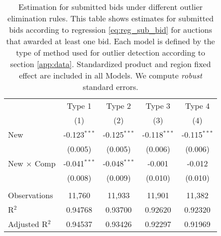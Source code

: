
\begin{table}[H]
   \centering
   \begin{tabular}{lcccc}
      \toprule
       & Type 1         & Type 2         & Type 3         & Type 4 \\ & (1)            & (2)            & (3)            & (4)\\  
      \midrule 
      New                       & -0.123$^{***}$ & -0.125$^{***}$ & -0.118$^{***}$ & -0.115$^{***}$\\   
                                & (0.005)        & (0.005)        & (0.006)        & (0.006)\\   
      New $\times$ Comp  & -0.041$^{***}$ & -0.048$^{***}$ & -0.001         & -0.012\\   
                                & (0.008)        & (0.009)        & (0.010)        & (0.010)\\   
       \\
      Observations              & 11,760         & 11,933         & 11,901         & 11,382\\  
      R$^2$                     & 0.94768        & 0.93700        & 0.92620        & 0.92320\\  
      Adjusted R$^2$            & 0.94537        & 0.93426        & 0.92297        & 0.91969\\  
      \bottomrule
   \end{tabular}
   \par \raggedright 
   \caption{Estimation for submitted bids under different outlier elimination rules. This table shows estimates for submitted bids according to  regression \eqref{eq:reg_sub_bid} for auctions that awarded at least one bid. Each model is defined by the type of method used for outlier detection according to section \ref{app:data}. Standardized product and region fixed effect are included in all Models. We compute \textit{robust} standard errors.}
\end{table}


